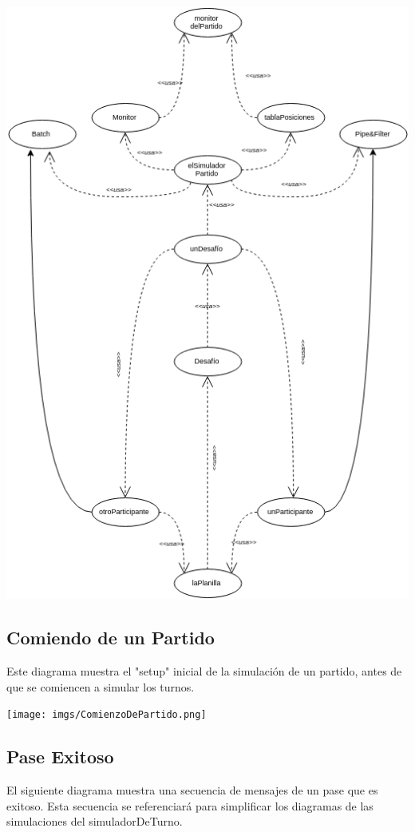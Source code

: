 \includegraphics[width=\textwidth]{imgs/aceptarDesafioObjetos.png}

\subsection{Comiendo de un Partido}
Este diagrama muestra el "setup" inicial de la simulación de un partido, antes de que se comiencen a simular los turnos.

\texttt{[image: imgs/ComienzoDePartido.png]}

\subsection{Pase Exitoso}

El siguiente diagrama muestra una secuencia de mensajes de un pase que es exitoso. Esta secuencia  se referenciará para simplificar los diagramas de las simulaciones del simuladorDeTurno.

